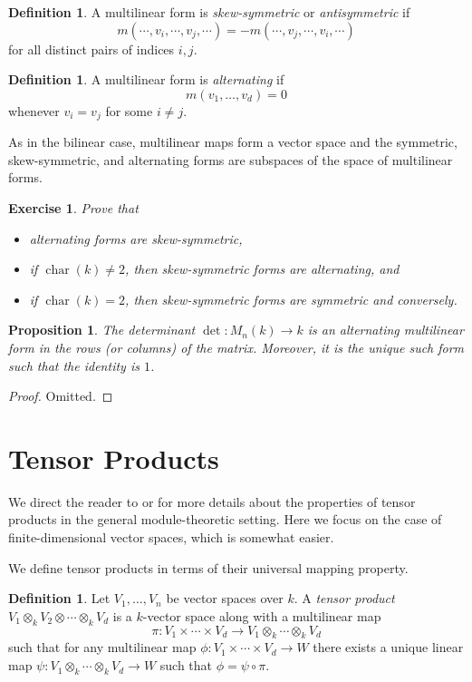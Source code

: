 \documentclass[12pt]{article}
\theoremstyle{plain}
\newtheorem{proposition}[theorem]{Proposition}
\newtheorem{exercise}[theorem]{Exercise}
\theoremstyle{definition}
\newtheorem{definition}[theorem]{Definition}
\theoremstyle{remark}
\numberwithin{equation}{section}
\begin{document}
\begin{definition}
A multilinear form is \emph{skew-symmetric} or \emph{antisymmetric} if
\[
m(\cdots,v_i,\cdots,v_j,\cdots) = -m(\cdots,v_j,\cdots,v_i,\cdots)
\]
for all distinct pairs of indices $i,j$.
\end{definition}

\begin{definition}
A multilinear form is \emph{alternating} if
\[
m(v_1,\ldots,v_d) = 0
\]
whenever $v_i=v_j$ for some $i \ne j$.
\end{definition}

As in the bilinear case, multilinear maps form a vector space and the
symmetric, skew-symmetric, and alternating forms are subspaces of the
space of multilinear forms.

\begin{exercise}
Prove that
\begin{itemize}
\item alternating forms are skew-symmetric,
\item if $\operatorname{char}(k) \ne 2$, then skew-symmetric forms are
alternating, and
\item if $\operatorname{char}(k) = 2$, then skew-symmetric forms are
symmetric and conversely.
\end{itemize}
\end{exercise}

\begin{proposition}
The determinant $\det : M_n(k) \to k$ is an alternating multilinear form
in the rows (or columns) of the matrix.
Moreover, it is the unique such form such that the identity is $1$.
\end{proposition}

\begin{proof}
Omitted.
\end{proof}

\section{Tensor Products}

We direct the reader to \cite[10.4]{DF} or \cite[XVI]{Lang}
for more details about the properties of tensor products in the general
module-theoretic setting.
Here we focus on the case of finite-dimensional vector spaces,
which is somewhat easier.

We define tensor products in terms of their universal mapping property.

\begin{definition}
Let $V_1,\ldots, V_n$ be vector spaces over $k$.
A \emph{tensor product} $V_1 \otimes_k V_2 \otimes \cdots \otimes_k V_d$
is a $k$-vector space along with a multilinear map
\[
\pi : V_1 \times \cdots \times V_d
\to  V_1 \otimes_k \cdots \otimes_k V_d
\]
such that for any multilinear map $\phi : V_1 \times \cdots \times V_d
\to W$ there exists a unique linear map
$\psi : V_1 \otimes_k \cdots \otimes_k V_d \to W$ such that
$\phi = \psi \circ \pi$.
\end{definition}
\end{document}
